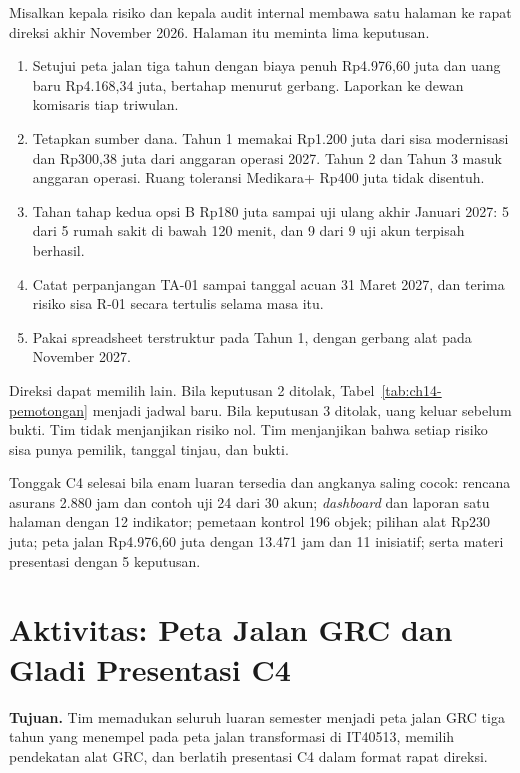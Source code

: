 \begin{kasus}[title={Kasus Medikara Health: Lima Keputusan yang Diminta}]
Misalkan kepala risiko dan kepala audit internal membawa satu halaman ke rapat direksi akhir
November 2026. Halaman itu meminta lima keputusan.
\begin{enumerate}
  \item Setujui peta jalan tiga tahun dengan biaya penuh Rp4.976,60 juta dan uang baru Rp4.168,34
  juta, bertahap menurut gerbang. Laporkan ke dewan komisaris tiap triwulan.
  \item Tetapkan sumber dana. Tahun 1 memakai Rp1.200 juta dari sisa modernisasi dan Rp300,38 juta
  dari anggaran operasi 2027. Tahun 2 dan Tahun 3 masuk anggaran operasi. Ruang toleransi Medikara+
  Rp400 juta tidak disentuh.
  \item Tahan tahap kedua opsi B Rp180 juta sampai uji ulang akhir Januari 2027: 5 dari 5 rumah
  sakit di bawah 120 menit, dan 9 dari 9 uji akun terpisah berhasil.
  \item Catat perpanjangan TA-01 sampai tanggal acuan 31 Maret 2027, dan terima risiko sisa R-01
  secara tertulis selama masa itu.
  \item Pakai spreadsheet terstruktur pada Tahun 1, dengan gerbang alat pada November 2027.
\end{enumerate}

Direksi dapat memilih lain. Bila keputusan 2 ditolak, Tabel~\ref{tab:ch14-pemotongan} menjadi jadwal
baru. Bila keputusan 3 ditolak, uang keluar sebelum bukti. Tim tidak menjanjikan risiko nol. Tim
menjanjikan bahwa setiap risiko sisa punya pemilik, tanggal tinjau, dan bukti.
\end{kasus}

Tonggak C4 selesai bila enam luaran tersedia dan angkanya saling cocok: rencana asurans 2.880 jam
dan contoh uji 24 dari 30 akun; \textit{dashboard} dan laporan satu halaman dengan 12 indikator;
pemetaan kontrol 196 objek; pilihan alat Rp230 juta; peta jalan Rp4.976,60 juta dengan 13.471 jam
dan 11 inisiatif; serta materi presentasi dengan 5 keputusan.

\section{Aktivitas: Peta Jalan GRC dan Gladi Presentasi C4}

\textbf{Tujuan.} Tim memadukan seluruh luaran semester menjadi peta jalan GRC tiga tahun yang
menempel pada peta jalan transformasi di IT40513, memilih pendekatan alat GRC, dan berlatih
presentasi C4 dalam format rapat direksi.

